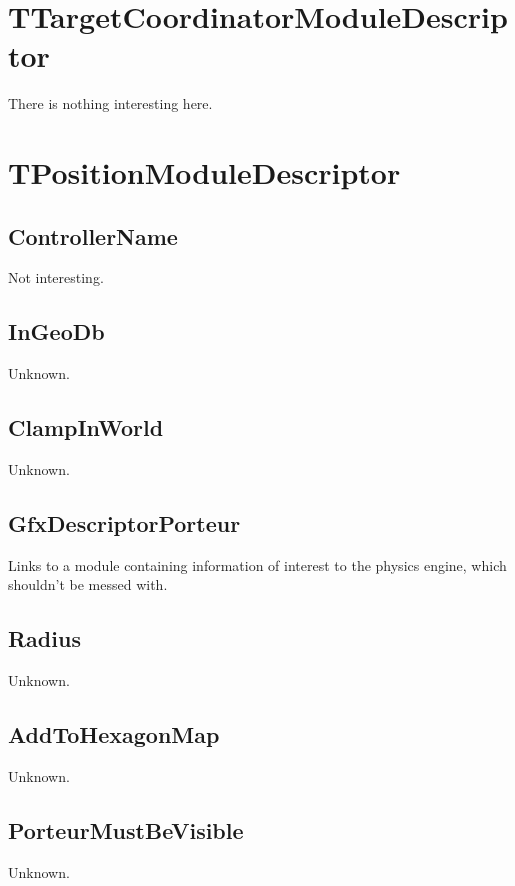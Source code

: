 \documentclass{article}
\begin{document}
\section{TTargetCoordinatorModuleDescriptor}

There is nothing interesting here.

\section{TPositionModuleDescriptor}

\subsection{ControllerName}

Not interesting.

\subsection{InGeoDb}

Unknown.

\subsection{ClampInWorld}

Unknown.

\subsection{GfxDescriptorPorteur}

Links to a module containing information of interest to the physics engine, which shouldn't be messed with.

\subsection{Radius}

Unknown.

\subsection{AddToHexagonMap}

Unknown.

\subsection{PorteurMustBeVisible}

Unknown.
\end{document}

